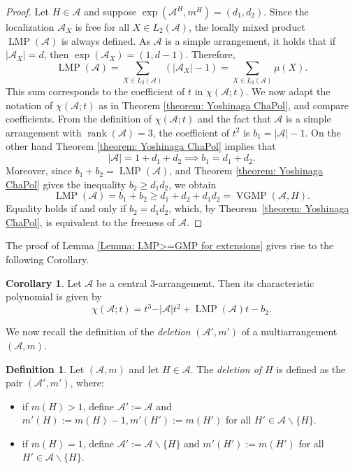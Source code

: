 \documentclass[12pt]{amsart}
\theoremstyle{definition}
\newtheorem{definition}[theorem]{Definition}
\newtheorem{corollary}[theorem]{Corollary}
\theoremstyle{remark}
\DeclareMathOperator{\LMP}{LMP}
\DeclareMathOperator{\VGMP}{VGMP}
\newcommand{\rank}{\operatorname{rank}}
\newcommand\CA{{\mathscr A}}
\begin{document}
\begin{proof}
    Let $H\in\CA$ and suppose $\exp(\CA^H,m^H)=(d_1,d_2)$. Since the localization $\CA_X$ is free for all $X\in L_2(\CA)$, the locally mixed product $\LMP(\CA)$ is always defined. As $\CA$ is a simple arrangement, it holds that if $\vert \CA_X\vert=d$, then $\exp(\CA_X)=(1,d-1)$. Therefore, $$\LMP(\CA)=\sum_{X\in L_2(\CA)}(\vert\CA_X\vert-1)=\sum_{X\in L_2(\CA)}\mu(X).$$ This sum corresponds to the coefficient of $t$ in $\chi(\CA;t)$. We now adapt the notation of $\chi(\CA;t)$ as in Theorem \ref{theorem: Yoshinaga ChaPol}, and compare coefficients. From the definition of $\chi(\CA;t)$ and the fact that $\CA$ is a simple arrangement with $\rank(\CA)=3$, the coefficient of $t^2$ is $b_1=\vert\CA\vert-1$. On the other hand Theorem \ref{theorem: Yoshinaga ChaPol} implies that $$\vert\CA\vert=1+d_1+d_2 \implies b_1=d_1+d_2.$$ Moreover, since $b_1+b_2=\LMP(\CA)$, and Theorem \ref{theorem: Yoshinaga ChaPol} gives the inequality $b_2\geq d_1d_2$, we obtain $$\LMP(\CA)=b_1+b_2\geq d_1+d_2+d_1d_2=\VGMP(\CA,H).$$ Equality holds if and only if $b_2=d_1d_2$, which, by Theorem~\ref{theorem: Yoshinaga ChaPol}, is equivalent to the freeness of $\CA$. 
    \end{proof}

The proof of Lemma \ref{Lemma: LMP>=GMP for extensions} gives rise to the following Corollary.

\begin{corollary}
    Let $\CA$ be a central $3$-arrangement. Then its characteristic polynomial is given by $$\chi(\CA;t)=t^3-\vert\CA\vert t^2+\LMP(\CA) t-b_2.$$
\end{corollary}

We now recall the definition of the \emph{deletion} $(\CA',m')$ of a multiarrangement $(\CA,m)$.
\begin{definition}
     Let $(\CA,m)$ and let $H\in\CA$. The \emph{deletion of $H$} is defined as the pair $(\CA',m')$, where:
\begin{center}
\begin{itemize}
\item if $m(H) > 1$, define $\CA':=\CA$ and $m'(H) := m(H)-1, m'(H') := m(H')$ for all $H'\in\CA\backslash\{H\}$.\\ 
\item if $m(H) = 1$, define $\CA':=\CA\backslash\{H\}$ and $m'(H') := m(H')$ for all $H'\in\CA\backslash\{H\}$.
\end{itemize}
\end{center}
\end{definition}
\end{document}
